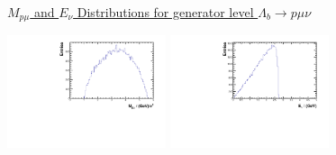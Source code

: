 \documentclass{beamer}
\begin{document}
{{\begin{center}
\end{center}
\hspace{1cm}  \uline{$M_{p\mu}$ and $E_{\nu}$ Distributions for generator level $\Lambda_{b} \rightarrow p \mu \nu$}
  \begin{center}
 
    \includegraphics[width=0.35\textwidth]{signal_Mpmu.pdf}  
\includegraphics[width=0.35\textwidth]{Enu_signal.pdf} 

\end{center}

}


}
\end{document}
